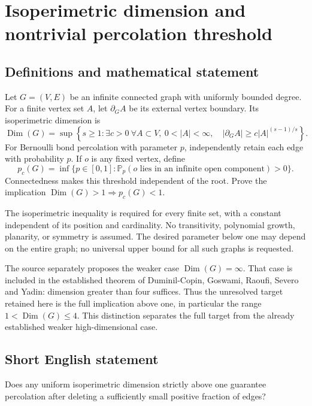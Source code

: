 \documentclass[11pt,a4paper]{article}
\begin{document}
\section*{Isoperimetric dimension and nontrivial percolation threshold}\label{statement}

\subsection{Definitions and mathematical statement}
Let $G=(V,E)$ be an infinite connected graph with uniformly bounded degree. For a finite vertex set $A$, let $\partial_G A$ be its external vertex boundary. Its isoperimetric dimension is
\[
\operatorname{Dim}(G)=\sup\left\{s\ge1:\exists c>0\ \forall A\subset V,
\ 0<|A|<\infty,\quad |\partial_G A|\ge c|A|^{(s-1)/s}\right\}.
\]
For Bernoulli bond percolation with parameter $p$, independently retain each edge with probability $p$. If $o$ is any fixed vertex, define
\[
p_c(G)=\inf\{p\in[0,1]:\mathbb P_p(o\text{ lies in an infinite open component})>0\}.
\]
Connectedness makes this threshold independent of the root. Prove the implication $\operatorname{Dim}(G)>1\Longrightarrow p_c(G)<1$.

The isoperimetric inequality is required for every finite set, with a constant independent of its position and cardinality. No transitivity, polynomial growth, planarity, or symmetry is assumed. The desired parameter below one may depend on the entire graph; no universal upper bound for all such graphs is requested.

The source separately proposes the weaker case $\operatorname{Dim}(G)=\infty$. That case is included in the established theorem of Duminil-Copin, Goswami, Raoufi, Severo and Yadin: dimension greater than four suffices. Thus the unresolved target retained here is the full implication above one, in particular the range $1<\operatorname{Dim}(G)\le4$. This distinction separates the full target from the already established weaker high-dimensional case.
\subsection{Short English statement}
Does any uniform isoperimetric dimension strictly above one guarantee percolation after deleting a sufficiently small positive fraction of edges?
\end{document}

